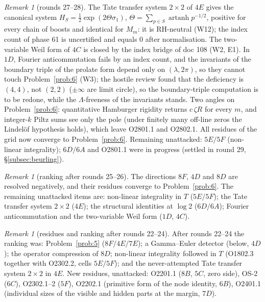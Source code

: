\documentclass[11pt]{amsart}
\theoremstyle{definition}
\theoremstyle{remark}
\newtheorem{remark}[theorem]{Remark}
\begin{document}
\begin{remark}[rounds 27--28]\label{rem:r2728}
The Tate transfer system $2\times2$ of $4E$ gives the canonical system $H_S=\frac12\exp(2\Theta\sigma_1)$,
$\Theta=\sum_{p\in S}\operatorname{artanh}p^{-1/2}$, positive for every chain of boosts and identical for $M_m$: it is
RH-neutral (W12); the index count of phase 61 is uncertified and equals $0$ after normalisation. The
two-variable Weil form of $4C$ is closed by the index bridge of doc 108 (W2, E1). In $1D$, Fourier
anticommutation fails by an index count, and the invariants of the boundary triple of the prolate form depend
only on $(\lambda,2\pi)$, so they cannot touch Problem~\ref{prob:6} (W3); the hostile review found that the
deficiency is $(4,4)$, not $(2,2)$ ($\pm\infty$ are limit circle), so the boundary-triple computation is to be
redone, while the $\Lambda$-freeness of the invariants stands. Two angles on Problem~\ref{prob:6}: quantitative
Hamburger rigidity returns $c\,\zeta R$ for every $m$, and integer-$k$ Piltz sums see only the pole (under finitely
many off-line zeros the Lindel\"of hypothesis holds), which leave O2801.1 and O2802.1. All residues of the grid now
converge to Problem~\ref{prob:6}. Remaining unattacked: $5E/5F$ (non-linear integrality); $6D/6A$ and O2801.1 were
in progress (settled in round 29, \S\ref{subsec:beurling}).
\end{remark}

\begin{remark}[ranking after rounds 25--26]
The directions $8F$, $4D$ and $8D$ are resolved negatively, and their residues converge to Problem~\ref{prob:6}.
The remaining unattacked items are: non-linear integrality in $T$ ($5E/5F$); the Tate transfer system $2\times2$ ($4E$);
the structural identities at $\log2$ ($6D/6A$); Fourier anticommutation and the two-variable Weil form ($1D$, $4C$).
\end{remark}

\begin{remark}[residues and ranking after rounds 22--24]
After rounds 22--24 the ranking was: Problem~\ref{prob:5} ($8F/4E/7E$); a Gamma--Euler detector (below, $4D$);
the operator compression of $8D$; non-linear integrality followed in $T$ (O1802.3 together with O2302.2, cells
$5E/5F$); and the never-attempted Tate transfer system $2\times2$ in $4E$. New residues, unattacked:
O2201.1 ($8B$, $5C$, zero side), OS-2 ($6C$), O2302.1--2 ($5F$), O2202.1 (primitive form of the node
identity, $6B$), O2401.1 (individual sizes of the visible and hidden parts at the margin, $7D$).
\end{remark}
\end{document}
